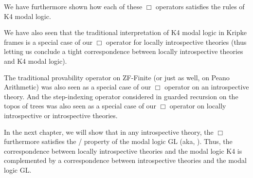 We have furthermore shown how each of these $\Box$ operators satisfies the rules of K4 modal logic.

We have also seen that the traditional interpretation of K4 modal logic in Kripke frames is a special case of our $\Box$ operator for locally introspective theories (thus letting us conclude a tight correspondence between locally introspective theories and K4 modal logic).

The traditional provability operator on ZF-Finite (or just as well, on Peano Arithmetic) was also seen as a special case of our $\Box$ operator on an introspective theory. And the step-indexing operator considered in guarded recursion on the topos of trees was also seen as a special case of our $\Box$ operator on locally introspective or introspective theories.

In the next chapter, we will show that in any introspective theory, the $\Box$ furthermore satisfies the \Loeb/ property of the modal logic GL (aka, ). Thus, the correspondence between locally introspective theories and the modal logic K4 is complemented by a correspondence between introspective theories and the modal logic GL.
\fileend